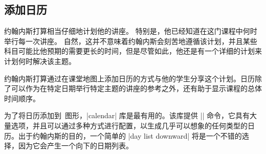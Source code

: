 \subsection{添加日历}


约翰内斯打算相当仔细地计划他的讲座。 特别是，他已经知道在这门课程中何时举行每一次讲座。 自然，这并不意味着约翰内斯会刻苦地遵循该计划，并且某些科目可能比他预期的需要更长的时间，但是尽管如此，他还是有一个详细的计划来计划何时解决该主题。


约翰内斯打算通过在课堂地图上添加日历的方式与他的学生分享这个计划。日历除了可以作为在特定日期举行特定主题的讲座的参考之外，还有助于显示课程的总体时间顺序。


为了将日历添加到\tikzname\ 图形，|calendar| 库是最有用的。该库提供 |\calendar| 命令，它具有大量选项，并且可以通过多种方式进行配置，以生成几乎可以想象的任何类型的日历。出于约翰内斯的目的，一个简单的 |day list downward| 将是一个不错的选择，因为它会产生一个向下的日期列表。

%
\begin{codeexample}[
    leave comments,
    preamble={\usetikzlibrary{calendar}},
]
\tiny
{}
\end{codeexample}

